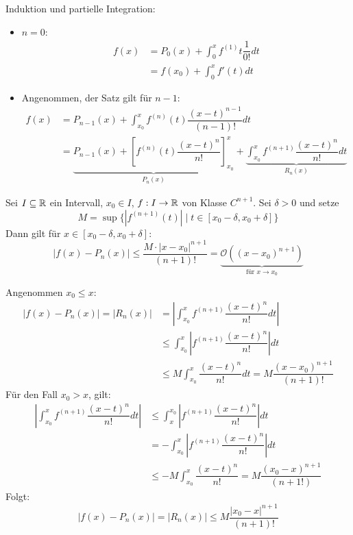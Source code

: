 \documentclass[main.tex]{subfiles}
\begin{document}
\begin{Beweis}
  Induktion und partielle Integration:
  \begin{itemize}
    \item $n = 0$:
      $$\begin{aligned}
        f(x) &= P_0(x) + \int_0^x f^{(1)} t \dfrac{1}{0!}dt\\
        &= f(x_0) + \int_0^x f'(t)dt
      \end{aligned}$$
      \checkmark
    \item Angenommen, der Satz gilt für $n - 1$:
      $$\begin{aligned}
        f(x) &= P_{n-1}(x) + \int_{x_0}^x f^{(n)} (t) \dfrac{(x-t)^{n-1}}{(n-1)!}dt \\
        &= \underbrace{P_{n-1}(x) + \left[f^{(n)} (t) \dfrac{(x-t)^n}{n!}\right]_{x_0}^x}_{P_n(x)} + \underbrace{\int_{x_0}^x f^{(n+1)} \dfrac{(x-t)^n}{n!}dt}_{R_n(x)}
      \end{aligned}$$
  \end{itemize}
\end{Beweis}

\begin{Korollar}
  Sei $I \subseteq \mathbb{R}$ ein Intervall, $x_0 \in I$, $f: I \to \mathbb{R}$ von Klasse $C^{n+1}$. Sei $\delta > 0$ und setze
  $$M = \sup\{|f^{(n+1)}(t)| \mid t \in [x_0-\delta, x_0 + \delta]\}$$
  Dann gilt für $x \in [x_0-\delta, x_0 + \delta]$:
  $$|f(x) - P_n(x)| \leq \dfrac{M \cdot |x - x_0|^{n+1}}{(n+1)!} = \underbrace{\mathcal{O}((x-x_0)^{n+1})}_{\text{für }x \to x_0}$$
\end{Korollar}

\begin{Beweis}
  Angenommen $x_0 \leq x$:
  $$\begin{aligned}
    |f(x) - P_n(x)| = |R_n(x)| &= \left|\int_{x_0}^x f^{(n+1)} \dfrac{(x-t)^n}{n!} dt \right|\\
    &\leq  \int_{x_0}^x \left| f^{(n+1)} \dfrac{(x-t)^n}{n!} \right| dt\\
    &\leq M \int_{x_0}^x \dfrac{(x-t)^n}{n!} dt = M \dfrac{(x - x_0)^{n+1}}{(n+1)!}
  \end{aligned}$$
  Für den Fall $x_0 > x$, gilt:
  $$\begin{aligned}
    \left|\int_{x_0}^x f^{(n+1)} \dfrac{(x-t)^n}{n!} dt \right| &\leq \int_{x}^{x_0} \left| f^{(n+1)} \dfrac{(x-t)^n}{n!} \right| dt\\
    &= -\int_{x_0}^{x} \left| f^{(n+1)} \dfrac{(x-t)^n}{n!} \right| dt\\
    &\leq -M \int_{x_0}^x \dfrac{(x-t)^n}{n!} = M \dfrac{(x_0 - x)^{n+1}}{(n+1!)}
  \end{aligned}$$
  Folgt:
  $$|f(x) - P_n(x)| = |R_n(x)| \leq  M \dfrac{|x_0 - x|^{n+1}}{(n+1)!}$$
\end{Beweis}
\end{document}
